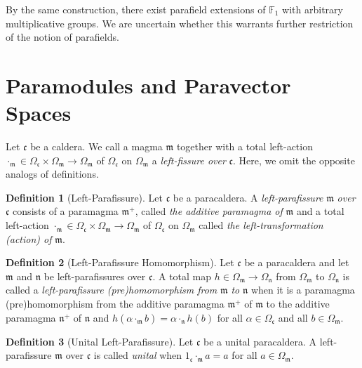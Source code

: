\documentclass{article}
\theoremstyle{definition}
\newtheorem{definition}{Definition}[section]
\begin{document}
By the same construction, there exist parafield extensions of \(\mathbb{F}_1\) with arbitrary multiplicative groups. We are uncertain whether this warrants further restriction of the notion of parafields.

\section{Paramodules and Paravector Spaces}

Let \(\mathfrak{c}\) be a caldera. We call a magma \(\mathfrak{m}\) together with a total left-action \(\cdot_\mathfrak{m}\in\Omega_\mathfrak{c}\times\Omega_\mathfrak{m}\to\Omega_\mathfrak{m}\) of \(\Omega_\mathfrak{c}\) on \(\Omega_\mathfrak{m}\) a \textit{left-fissure over} \(\mathfrak{c}\). Here, we omit the opposite analogs of definitions.

\begin{definition}[Left-Parafissure]
Let \(\mathfrak{c}\) be a paracaldera. A \textit{left-parafissure} \(\mathfrak{m}\) \textit{over} \(\mathfrak{c}\) consists of a paramagma \(\mathfrak{m}^+\), called \textit{the additive paramagma of} \(\mathfrak{m}\) and a total left-action \(\cdot_\mathfrak{m}\in\Omega_\mathfrak{c}\times\Omega_\mathfrak{m}\to\Omega_\mathfrak{m}\) of \(\Omega_\mathfrak{c}\) on \(\Omega_\mathfrak{m}\) called \textit{the left-transformation (action) of} \(\mathfrak{m}\).
\end{definition}

\begin{definition}[Left-Parafissure Homomorphism]
Let \(\mathfrak{c}\) be a paracaldera and let \(\mathfrak{m}\) and \(\mathfrak{n}\) be left-parafissures over \(\mathfrak{c}\). A total map \(h\in\Omega_\mathfrak{m}\to\Omega_\mathfrak{n}\) from \(\Omega_\mathfrak{m}\) to \(\Omega_\mathfrak{n}\) is called a \textit{left-parafissure (pre)homomorphism from} \(\mathfrak{m}\) \textit{to} \(\mathfrak{n}\) when it is a paramagma (pre)homomorphism from the additive paramagma \(\mathfrak{m}^+\) of \(\mathfrak{m}\) to the additive paramagma \(\mathfrak{n}^+\) of \(\mathfrak{n}\) and \(h(\alpha\cdot_\mathfrak{m}b)=\alpha\cdot_\mathfrak{n}h(b)\) for all \(\alpha\in\Omega_\mathfrak{c}\) and all \(b\in\Omega_\mathfrak{m}\).
\end{definition}

\begin{definition}[Unital Left-Parafissure]
Let \(\mathfrak{c}\) be a unital paracaldera. A left-parafissure \(\mathfrak{m}\) over \(\mathfrak{c}\) is called \textit{unital} when \(1_\mathfrak{c}\cdot_\mathfrak{m}a=a\) for all \(a\in\Omega_\mathfrak{m}\).
\end{definition}
\end{document}

